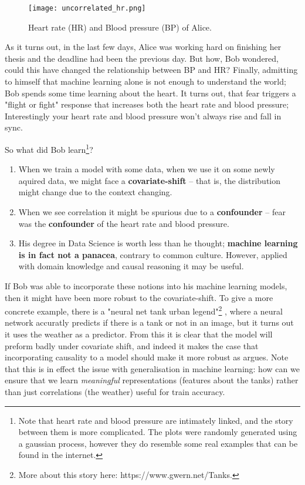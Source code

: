 \begin{figure}[H]
    \centering
    \texttt{[image: uncorrelated\_hr.png]}
    \caption{Heart rate (HR) and Blood pressure (BP) of Alice.}
\end{figure}

As it turns out, in the last few days, Alice was working hard on finishing her thesis and the deadline had been 
the previous day. But how, Bob wondered, could this have changed the relationship between BP and HR? 
Finally, admitting to himself that machine learning alone is not enough to understand the world; 
Bob spends some time learning about the heart. It turns out, that fear triggers a "flight or fight"
response that increases both the heart rate and blood pressure; Interestingly your heart rate and blood pressure 
won’t always rise and fall in sync.

So what did Bob learn\footnote{
    Note that heart rate and blood pressure are intimately linked, and the story between them is more complicated.
    The plots were randomly generated using a gaussian process, however they do resemble some real examples that 
    can be found in the internet.
}?

\begin{enumerate}
    \item When we train a model with some data, when we use it on some newly aquired data, we might
    face a \textbf{covariate-shift} -- that is, the distribution might change due to the context changing.
    \item When we see correlation it might be spurious due to a \textbf{confounder} -- fear was the \textbf{confounder} 
    of the heart rate and blood pressure.
    \item His degree in Data Science is worth less than he thought; \textbf{machine learning is in fact not 
    a panacea}, contrary to common culture. However, applied with domain knowledge and causal reasoning
    it may be useful. 
\end{enumerate}

If Bob was able to incorporate these notions into his machine learning models, then it might have been more
robust to the covariate-shift. To give a more concrete example, there is a "neural net tank urban legend"\footnote{
    More about this story here: https://www.gwern.net/Tanks.
}
, where a neural network accuratly predicts if there is a tank or not in an image, but it turns out it uses the 
weather as a predictor. From this it is clear that the model will preform badly under covariate shift, and indeed
it makes the case that incorporating causality to a model should make it more robust as
\cite{scholkopf2019causality} argues. Note that this is in effect the issue with generalisation in machine learning:
how can we ensure that we learn \textit{meaningful} representations (features about the tanks) rather than just
correlations (the weather) useful for train accuracy. 

